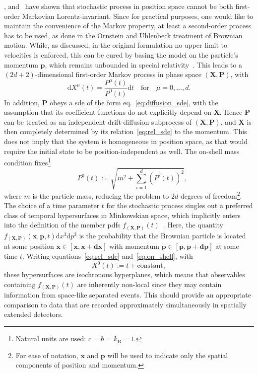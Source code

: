 \documentclass[a4paper,12pt]{book}
\begin{document}
\textcite{Lopuszanski1953}, \textcite{Dudley1966} and~\textcite{Hakim1968} have shown that stochastic process in position space cannot be both first-order Markovian Lorentz-invariant. Since for practical purposes, one would like to maintain the convenience of the Markov property, at least a second-order process has to be used, as done in the Ornstein and Uhlenbeck treatment of Brownian motion. While, as discussed, in the original formulation no upper limit to velocities is enforced, this can be cured by basing the model on the particle's momentum $\bm{p}$, which remains unbounded in special relativity~\parencite{debbasch_relativistic_1997,Dunkel2005a,Dunkel2005b}.
This leads to a $(2d+2)$-dimensional first-order Markov process in phase space $(\bm{X},\bm{P})$, with
\begin{equation}
\label{eq:rel_sde}
    \mathrm{d}X^\mu(t) = \frac{P^\mu(t)}{P^0(t)}\mathrm{d}t \quad \text{for} \quad \mu = 0,...,d.
\end{equation}
In addition, $\bm{P}$ obeys a \acrshort{sde} of the form eq.~\eqref{eq:diffusion_sde}, with the assumption that its coefficient functions do not explicitly depend on $\bm{X}$. Hence $\bm{P}$ can be treated as an independent drift-diffusion subprocess of $(\bm{X},\bm{P})$, and $\bm{X}$ is then completely determined by its relation~\eqref{eq:rel_sde} to the momentum. This does not imply that the system is homogeneous in position space, as that would require the initial state to be position-independent as well.  The on-shell mass condition fixes\footnote{Natural units are used: $c=\hbar=k_\text{B}=1$.}
\begin{equation}
\label{eq:on_shell}
  \quad P^0(t):=\sqrt{m ^2+\sum_{i=1}^d\left(P^i(t)\right)^2},
\end{equation}
where $m$ is the particle mass, reducing the problem to $2d$ degrees of freedom\footnote{For ease of notation, $\bm{x}$ and $\bm{p}$ will be used to indicate only the spatial components of position and momentum.}.
The choice of a time parameter $t$ for the stochastic process singles out a preferred class of temporal hypersurfaces in
Minkowskian space, which implicitly enters into the definition of the member \acrshort{pdf}s $f_{(\bm{X},\bm{P})}(t)$~\parencite{dunkel_non-local_2009}. Here, the quantity  $f_{(\bm{X},\bm{P})}(\bm{x},\bm{p},t)\mathrm{d}x^3\mathrm{d}p^3$ is the probability that the Brownian particle is located at some position $\bm{x} \in [\bm{x},\bm{x}+\textbf{d} \bm{x}]$ with momentum $\bm{p} \in [\bm{p},\bm{p}+\textbf{d} \bm{p}]$ at some time $t$. Writing equations~\eqref{eq:rel_sde} and~\eqref{eq:on_shell}, with 
\begin{equation}
    X^0(t):= t + \text{constant},
\end{equation}
these hypersurfaces are isochronous hyperplanes, which means that observables containing $f_{(\bm{X},\bm{P})}(t)$ are inherently non-local since they may contain information from space-like separated events. This should provide an appropriate comparison to data that are recorded approximately simultaneously in spatially extended detectors. \\
\end{document}
